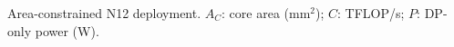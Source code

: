 \begin{table}[!t]
\centering
\caption{Area-constrained N12 deployment. $A_C$: core area (mm$^2$); $C$: TFLOP/s; $P$: DP-only power (W).}
\label{tab:k4_absolute}
\begingroup\footnotesize\setlength{\tabcolsep}{3pt}

\endgroup
\end{table}
